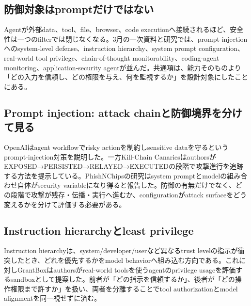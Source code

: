 \begingroup\raggedright
\subsection{防御対象はpromptだけではない}
\par\endgroup

Agentが外部data、tool、file、browser、code executionへ接続されるほど、安全性は一つのfilterでは閉じなくなる。3月の一次資料と研究では、prompt injectionへのsystem-level defense、instruction hierarchy、system prompt configuration、real-world tool privilege、chain-of-thought monitorability、coding-agent monitoring、application-security agentが並んだ。共通項は、能力そのものより「どの入力を信頼し、どの権限を与え、何を監視するか」を設計対象にしたことにある。\autocite{src-18b7ee4fe5e4,src-287a6bf67154,src-3dec299964e6,src-549bffaad22c,src-5becf449a527,src-87dacccfecfd,src-b4b340379768,src-e627c8192172}


\begingroup\raggedright
\subsection{Prompt injection: attack chainと防御境界を分けて見る}
\par\endgroup

OpenAIはagent workflowでrisky actionを制約しsensitive dataを守るというprompt-injection対策を説明した。一方Kill-Chain CanariesはauthorsがEXPOSED→PERSISTED→RELAYED→EXECUTEDの段階で攻撃進行を追跡する方法を提示している。PhishNChipsの研究はsystem promptとmodelの組み合わせ自体がsecurity variableになり得ると報告した。防御の有無だけでなく、どの段階で攻撃が残存・伝播・実行へ進むか、configurationがattack surfaceをどう変えるかを分けて評価する必要がある。\autocite{src-3dec299964e6,src-87dacccfecfd,src-e627c8192172}


\begingroup\raggedright
\subsection{Instruction hierarchyとleast privilege}
\par\endgroup

Instruction hierarchyは、system/developer/userなど異なるtrust levelの指示が衝突したとき、どれを優先するかをmodel behaviorへ組み込む方向である。これに対しGrantBoxはauthorsがreal-world toolsを使うagentのprivilege usageを評価するsandboxとして提案した。前者が「どの指示を信頼するか」、後者が「どの操作権限まで許すか」を扱い、両者を分離することでtool authorizationとmodel alignmentを同一視せずに済む。\autocite{src-18b7ee4fe5e4,src-549bffaad22c}


